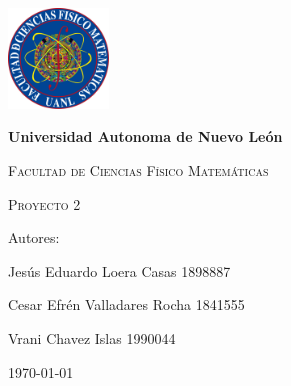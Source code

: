 \begin{titlepage}
    \centering
    {\includegraphics[width=0.2\textwidth]{FCFM.png}\par}
    \vspace{1cm}
    {\bfseries\LARGE Universidad Autonoma de Nuevo León \par}
    \vspace{1cm}
    {\scshape\Large Facultad de Ciencias Físico Matemáticas \par}
    \vspace{3cm}
    {\scshape\Huge Proyecto 2  \par}
    \vspace{3cm}
    {\Large Autores: \par}
    \vfill
    {\Large Jesús Eduardo Loera Casas 1898887 \par}
    \vfill{\Large Cesar Efrén Valladares Rocha 1841555 \par}
    \vfill
    {\Large Vrani Chavez Islas 1990044 \par}
    \vfill
    {\Large \today \par}
\end{titlepage}